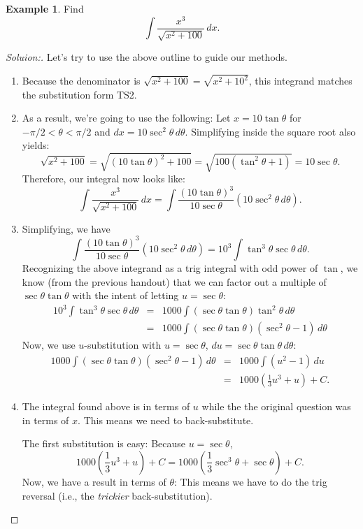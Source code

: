 \documentclass[12pt]{article}
\theoremstyle{definition}
\newtheorem{ex}{Example}
\newcommand{\sol}[1]{\begin{proof}[Soluion:]#1\end{proof}}
\begin{document}
	\begin{ex}
		Find
		$$\int\frac{x^3}{\sqrt{x^2+100}}\,dx.$$
	\end{ex}
	\sol{Let's try to use the above outline to guide our methods.
		
	\begin{enumerate}[label=P\arabic*.,leftmargin=0.75in]
		\item Because the denominator is $\sqrt{x^2+100}=\sqrt{x^2+10^2}$, this integrand matches the substitution form TS2.
		
		\item As a result, we're going to use the following: Let $x=10\tan\theta$ for $-\pi/2 < \theta < \pi/2$ and $dx=10\sec^2\theta\,d\theta$. Simplifying inside the square root also yields:
		$$\sqrt{x^2+100}=\sqrt{(10\tan\theta)^2+100}=\sqrt{100(\tan^2\theta+1)}=10\sec\theta.$$
		Therefore, our integral now looks like:
		$$\int\frac{x^3}{\sqrt{x^2+100}}\,dx=\int\frac{(10\tan\theta)^3}{10\sec\theta}\left(10\sec^2\theta\,d\theta\right).$$
		
		\item Simplifying, we have
		$$\int\frac{(10\tan\theta)^3}{10\sec\theta}\left(10\sec^2\theta\,d\theta\right)=10^3\int\tan^3\theta\sec\theta\,d\theta.$$
		Recognizing the above integrand as a trig integral with odd power of $\tan$, we know (from the previous handout) that we can factor out a multiple of $\sec\theta\tan\theta$ with the intent of letting $u=\sec\theta$:
		$$\begin{array}{rcl}10^3\int\tan^3\theta\sec\theta\,d\theta & = & 1000\int(\sec\theta\tan\theta)\tan^2\theta\,d\theta \\ & = & 1000\int(\sec\theta\tan\theta)(\sec^2\theta-1)\,d\theta\end{array}$$
		Now, we use $u$-substitution with $u=\sec\theta$, $du=\sec\theta\tan\theta\,d\theta$:
		$$\begin{array}{rcl}1000\int(\sec\theta\tan\theta)(\sec^2\theta-1)\,d\theta & = & 1000\int(u^2-1)\,du \\ & = & 1000\left(\frac{1}{3}u^3+u\right)+C.\end{array}$$
		
		\item The integral found above is in terms of $u$ while the the original question was in terms of $x$. This means we need to back-substitute.
		
		The first substitution is easy: Because $u=\sec\theta$,
		\begin{equation}
		\label{ThetaInt1}
		1000\left(\frac{1}{3}u^3+u\right)+C=1000\left(\frac{1}{3}\sec^3\theta+\sec\theta\right)+C.\end{equation}
		Now, we have a result in terms of $\theta$: This means we have to do the trig reversal (i.e., the \textit{trickier} back-substitution).
		

\end{enumerate}}
\end{document}
